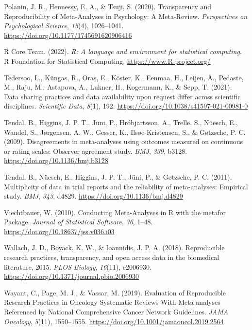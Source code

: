 \documentclass[
  ,man,floatsintext]{apa6}
\newlength{\cslhangindent}
\newlength{\cslentryspacingunit} %
\newenvironment{CSLReferences}[2] %
 {%
  \setlength{\parindent}{0pt}
  \ifodd #1
  \let\oldpar\par
  \def\par{\hangindent=\cslhangindent\oldpar}
  \fi
  \setlength{\parskip}{#2\cslentryspacingunit}
 }%
 {}
\begin{document}
\begin{CSLReferences}{1}{0}
\leavevmode{}%
Polanin, J. R., Hennessy, E. A., \& Tsuji, S. (2020). Transparency and {Reproducibility} of {Meta-Analyses} in {Psychology}: {A Meta-Review}. \emph{Perspectives on Psychological Science}, \emph{15}(4), 1026--1041. \url{https://doi.org/10.1177/1745691620906416}

\leavevmode{}%
R Core Team. (2022). \emph{R: A language and environment for statistical computing}. R Foundation for Statistical Computing. \url{https://www.R-project.org/}

\leavevmode{}%
Tedersoo, L., Küngas, R., Oras, E., Köster, K., Eenmaa, H., Leijen, Ä., Pedaste, M., Raju, M., Astapova, A., Lukner, H., Kogermann, K., \& Sepp, T. (2021). Data sharing practices and data availability upon request differ across scientific disciplines. \emph{Scientific Data}, \emph{8}(1), 192. \url{https://doi.org/10.1038/s41597-021-00981-0}

\leavevmode{}%
Tendal, B., Higgins, J. P. T., Jüni, P., Hróbjartsson, A., Trelle, S., Nüesch, E., Wandel, S., Jørgensen, A. W., Gesser, K., Ilsøe-Kristensen, S., \& Gøtzsche, P. C. (2009). Disagreements in meta-analyses using outcomes measured on continuous or rating scales: Observer agreement study. \emph{BMJ}, \emph{339}, b3128. \url{https://doi.org/10.1136/bmj.b3128}

\leavevmode{}%
Tendal, B., Nüesch, E., Higgins, J. P. T., Jüni, P., \& Gøtzsche, P. C. (2011). Multiplicity of data in trial reports and the reliability of meta-analyses: Empirical study. \emph{BMJ}, \emph{343}, d4829. \url{https://doi.org/10.1136/bmj.d4829}

\leavevmode{}%
Viechtbauer, W. (2010). Conducting {Meta-Analyses} in {R} with the metafor {Package}. \emph{Journal of Statistical Software}, \emph{36}, 1--48. \url{https://doi.org/10.18637/jss.v036.i03}

\leavevmode{}%
Wallach, J. D., Boyack, K. W., \& Ioannidis, J. P. A. (2018). Reproducible research practices, transparency, and open access data in the biomedical literature, 2015. \emph{PLOS Biology}, \emph{16}(11), e2006930. \url{https://doi.org/10.1371/journal.pbio.2006930}

\leavevmode{}%
Wayant, C., Page, M. J., \& Vassar, M. (2019). Evaluation of {Reproducible} {Research} {Practices} in {Oncology} {Systematic} {Reviews} {With} {Meta}-analyses {Referenced} by {National} {Comprehensive} {Cancer} {Network} {Guidelines}. \emph{JAMA Oncology}, \emph{5}(11), 1550--1555. \url{https://doi.org/10.1001/jamaoncol.2019.2564}


\end{CSLReferences}
\end{document}
